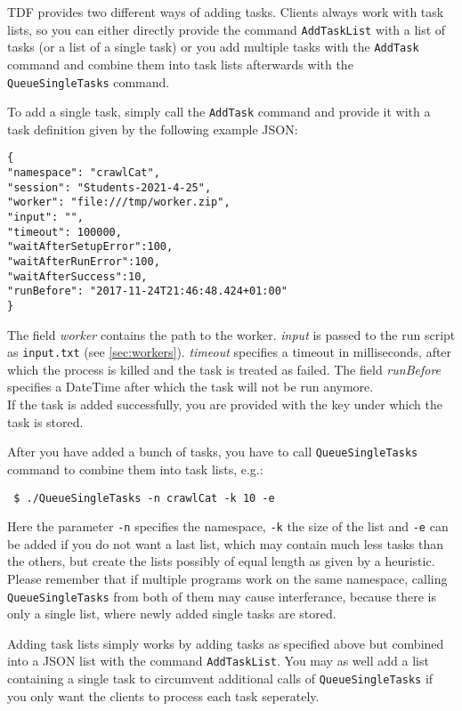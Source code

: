 \documentclass[a4paper,11pt]{article}
\begin{document}
TDF provides two different ways of adding tasks. Clients always work with task lists, so you can either directly provide the command \texttt{AddTaskList} with a list of tasks (or a list of a single task) or you add multiple tasks with the \texttt{AddTask} command and combine them into task lists afterwards with the \texttt{QueueSingleTasks} command.

To add a single task, simply call the \texttt{AddTask} command and provide it with a task definition given by the following example JSON:
\begin{verbatim}
{
"namespace": "crawlCat",
"session": "Students-2021-4-25",
"worker": "file:///tmp/worker.zip",
"input": "",
"timeout": 100000,
"waitAfterSetupError":100,
"waitAfterRunError":100,
"waitAfterSuccess":10,
"runBefore": "2017-11-24T21:46:48.424+01:00"
}
\end{verbatim}

The field \textit{worker} contains the path to the worker. \textit{input} is passed to the run script as \texttt{input.txt} (see \ref{sec:workers}). \textit{timeout} specifies a timeout in milliseconds, after which the process is killed and the task is treated as failed. The field \textit{runBefore} specifies a DateTime after which the task will not be run anymore.\\
If the task is added successfully, you are provided with the key under which the task is stored.

After you have added a bunch of tasks, you have to call \texttt{QueueSingleTasks} command to combine them into task lists, e.g.:
\begin{verbatim}
 $ ./QueueSingleTasks -n crawlCat -k 10 -e
\end{verbatim}
Here the parameter \texttt{-n} specifies the namespace, \texttt{-k} the size of the list and \texttt{-e} can be added if you do not want a last list, which may contain much less tasks than the others, but create the lists possibly of equal length as given by a heuristic.\\
Please remember that if multiple programs work on the same namespace, calling \texttt{QueueSingleTasks} from both of them may cause interferance, because there is only a single list, where newly added single tasks are stored. 

Adding task lists simply works by adding tasks as specified above but combined into a JSON list with the command \texttt{AddTaskList}. You may as well add a list containing a single task to circumvent additional calls of \texttt{QueueSingleTasks} if you only want the clients to process each task seperately.
\end{document}
